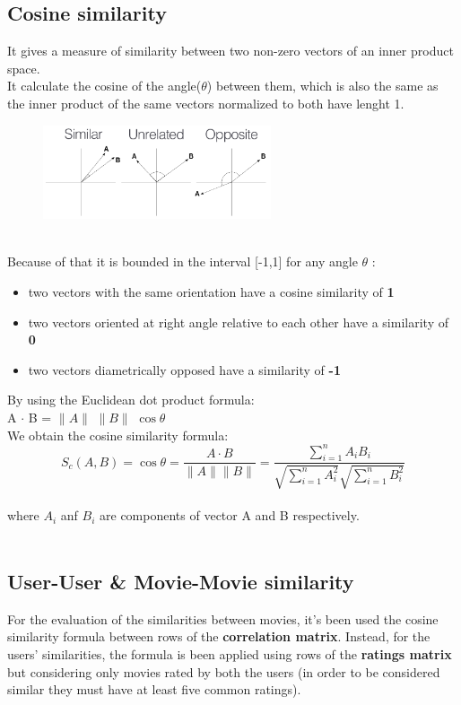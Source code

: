 \documentclass{article}
\begin{document}
\subsection{Cosine similarity}
It gives a measure of similarity between two non-zero vectors of an inner product space.\\It calculate the cosine of the angle($\theta$) between them, which is also the same as the inner product of the same vectors normalized to both have lenght 1. \\
\begin{figure}[ht]
      \begin{center}
            \includegraphics[width=0.6\textwidth]{images/cosine.png}
      \end{center}
\end{figure}\\
Because of that it is bounded in the interval [-1,1] for any angle $\theta$ :
\begin{itemize}
      \item two vectors with the same orientation have a cosine similarity of \textbf{1}
      \item two vectors oriented at right angle relative to each other have a similarity of \textbf{0}
      \item two vectors diametrically opposed have a similarity of \textbf{-1}
\end{itemize}
By using the Euclidean dot product formula:\\
A $\cdot$ B = $\|A\|$ $\|B\|$ $\cos\theta$ \\
We obtain the cosine similarity formula:\\
\begin{equation}
      S_c(A,B) = \cos\theta = \frac{A \cdot B}{\|A\| \|B\|} = \frac{\sum_{i=1}^n A_i B_i}{\sqrt{\sum_{i=1}^n A_i^2}\sqrt{\sum_{i=1}^n B_i^2}}
\end{equation}\\
where $A_i$ anf $B_i$ are components of vector A and B respectively.\\ \\


\subsection{User-User \& Movie-Movie similarity}
For the evaluation of the similarities between movies, it's been used the cosine similarity formula between rows of the \textbf{correlation matrix}. Instead, for the users' similarities, the formula is been applied using rows of the \textbf{ratings matrix} but considering only movies rated by both the users (in order to be considered similar they must have at least five common ratings).\\
\end{document}
